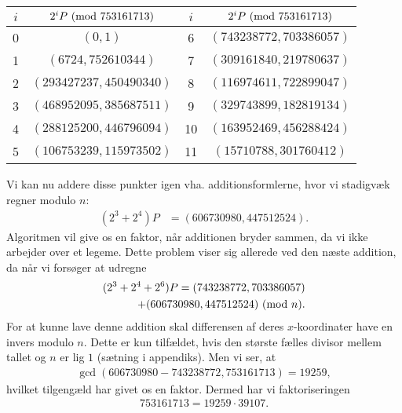 \begin{example}
\begin{center}
\begin{tabular}{c c c c}
$i$ & $2^i P \ (\mathrm{mod} \ 753161713)$ & $i$ & $2^i P \ (\mathrm{mod} \ 753161713)$ \\ 
\hline 
0 & $(0, 1)$ & 6 & $(743238772, 703386057)$  \\ 
1 & $(6724, 752610344)$ & 7 & $(309161840, 219780637)$  \\ 
2 & $(293427237, 450490340)$ & 8 & $(116974611, 722899047)$ \\ 
3 & $(468952095, 385687511)$ & 9 & $(329743899, 182819134)$ \\ 
4 & $(288125200, 446796094)$ & 10 & $(163952469, 456288424)$ \\ 
5 & $(106753239, 115973502)$ & 11 & $(15710788, 301760412)$
\end{tabular} 
\end{center}
Vi kan nu addere disse punkter igen vha. additionsformlerne, hvor vi stadigvæk regner modulo $n$:
\begin{align*}
	(2^3 + 2^4)P &= (606730980, 447512524). 
\end{align*}
Algoritmen vil give os en faktor, når additionen bryder sammen, da vi ikke arbejder over et legeme. Dette problem viser sig allerede ved den næste addition, da når vi forsøger at udregne
\begin{align*}
	(2^3 + 2^4 + 2^6) P = (743238772, 703386057) \\ + (606730980, 447512524) \ (\mathrm{mod} \ n).
\end{align*}
For at kunne lave denne addition skal differensen af deres $x$-koordinater have en invers modulo $n$. Dette er kun tilfældet, hvis den største fælles divisor mellem tallet og $n$ er lig $1$ (sætning i appendiks). Men vi ser, at  
\begin{align*}
	\gcd(606730980 - 743238772, 753161713) = 19259,
\end{align*}
hvilket tilgengæld har givet os en faktor. Dermed har vi faktoriseringen 
\begin{align*}
	753161713 = 19259 \cdot 39107.
\end{align*}


\end{example}




